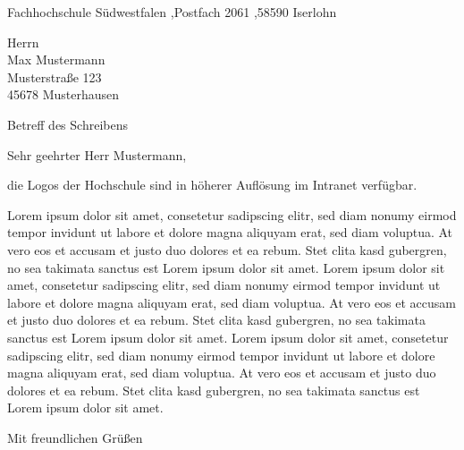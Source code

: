 \documentclass[a4paper, 10pt, parskip=off, headheight=25mm, footheight=25mm]{scrartcl}
\newcommand{\name}{{{Ihr Name}}}
\newcommand{\postfach}{Fachhochschule Südwestfalen \sep Postfach 2061 \sep 58590 Iserlohn}
\begin{document}
\begin{anschreiben}

\begin{absender}
\postfach
\end{absender}

\begin{empfaenger}
{{Herrn \\ Max Mustermann \\ Musterstraße 123 \\ 45678 Musterhausen }}
\end{empfaenger}

\begin{betreff}
{{Betreff des Schreibens}}
\end{betreff}

\begin{text}
{{Sehr geehrter Herr Mustermann, }}

die Logos der Hochschule sind in höherer Auflösung im Intranet verfügbar.

Lorem ipsum dolor sit amet, consetetur sadipscing elitr, sed diam nonumy eirmod tempor invidunt ut labore et dolore magna aliquyam erat, sed diam voluptua. At vero eos et accusam et justo duo dolores et ea rebum. Stet clita kasd gubergren, no sea takimata sanctus est Lorem ipsum dolor sit amet. Lorem ipsum dolor sit amet, consetetur sadipscing elitr, sed diam nonumy eirmod tempor invidunt ut labore et dolore magna aliquyam erat, sed diam voluptua. At vero eos et accusam et justo duo dolores et ea rebum. Stet clita kasd gubergren, no sea takimata sanctus est Lorem ipsum dolor sit amet. Lorem ipsum dolor sit amet, consetetur sadipscing elitr, sed diam nonumy eirmod tempor invidunt ut labore et dolore magna aliquyam erat, sed diam voluptua. At vero eos et accusam et justo duo dolores et ea rebum. Stet clita kasd gubergren, no sea takimata sanctus est Lorem ipsum dolor sit amet.

Mit freundlichen Grüßen
\end{text}

\vspace{10mm}
\Titel\name

\end{anschreiben}
\end{document}
